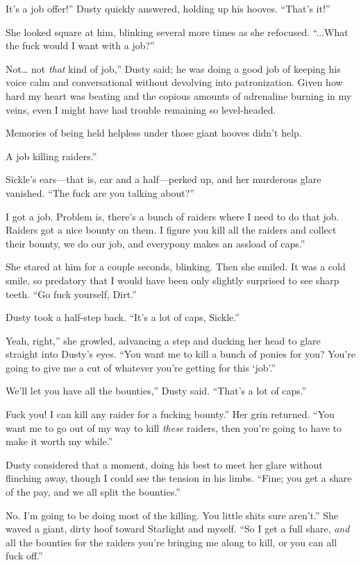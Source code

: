 \leavevmode{}It’s a job offer!” Dusty quickly answered, holding up his hooves. “That’s it!”

She looked square at him, blinking several more times as she refocused. “...What the fuck would I want with a job?”

\leavevmode{}Not… not \textit{that} kind of job,” Dusty said; he was doing a good job of keeping his voice calm and conversational without devolving into patronization. Given how hard my heart was beating and the copious amounts of adrenaline burning in my veins, even I might have had trouble remaining so level-headed.

Memories of being held helpless under those giant hooves didn’t help.

\leavevmode{}A job killing raiders.”

Sickle’s ears—that is, ear and a half—perked up, and her murderous glare vanished. “The fuck are you talking about?”

\leavevmode{}I got a job. Problem is, there’s a bunch of raiders where I need to do that job. Raiders got a nice bounty on them. I figure you kill all the raiders and collect their bounty, we do our job, and everypony makes an assload of caps.”

She stared at him for a couple seconds, blinking. Then she smiled. It was a cold smile, so predatory that I would have been only slightly surprised to see sharp teeth. “Go fuck yourself, Dirt.”

Dusty took a half-step back. “It’s a lot of caps, Sickle.”

\leavevmode{}Yeah, right,” she growled, advancing a step and ducking her head to glare straight into Dusty’s eyes. “You want me to kill a bunch of ponies for you? You’re going to give me a cut of whatever you’re getting for this ‘job’.”

\leavevmode{}We’ll let you have all the bounties,” Dusty said. “That’s a lot of caps.”

\leavevmode{}Fuck you! I can kill any raider for a fucking bounty.” Her grin returned. “You want me to go out of my way to kill \textit{these} raiders, then you’re going to have to make it worth my while.”

Dusty considered that a moment, doing his best to meet her glare without flinching away, though I could see the tension in his limbs. “Fine; you get a share of the pay, and we all split the bounties.”

\leavevmode{}No. I’m going to be doing most of the killing. You little shits sure aren’t.” She waved a giant, dirty hoof toward Starlight and myself. “So I get a full share, \textit{and} all the bounties for the raiders you’re bringing me along to kill, or you can all fuck off.”

